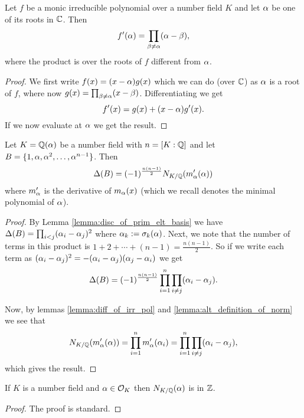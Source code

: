 \begin{lemma}\label{lemma:diff_of_irr_pol}
    \leanok
	Let $f$ be a monic irreducible polynomial over a number field $K$ and let $\alpha$ be one of its roots in $\mathbb{C}$. Then \[f'(\alpha)=\prod_{\beta \neq \alpha} (\alpha-\beta),  \] where the product is over the roots of $f$ different from $\alpha$.
\end{lemma}
\begin{proof}
    \leanok
	We first write $f(x)=(x-\alpha)g(x)$ which we can do (over $\mathbb{C}$) as $\alpha$ is a root of $f$, where now $g(x)=\prod_{\beta \neq \alpha} (x-\beta)$. Differentiating we get \[f'(x)=g(x)+(x-\alpha)g'(x).\] If we now evaluate at $\alpha$ we get the result.
\end{proof}

\begin{lemma}\label{lemma:num_field_disc_in_terms_of_norm}
	\leanok
	Let $K=\mathbb{Q}(\alpha)$ be a number field with $n=[K:\mathbb{Q}]$ and let $B=\{1,\alpha,\alpha^2,\dots,\alpha^{n-1}\}$. Then \[\Delta(B)=(-1)^{\frac{n(n-1)}{2}}N_{K/\mathbb{Q}}(m_\alpha'(\alpha))\] where $m_\alpha'$ is the derivative of $m_\alpha(x)$ (which we recall denotes the minimal polynomial of $\alpha$).
\end{lemma}
\begin{proof}
    \leanok
	By Lemma \ref{lemma:disc_of_prim_elt_basis} we have $\Delta(B)=\prod_{i < j}(\alpha_i-\alpha_j)^2$ where $\alpha_k:=\sigma_k(\alpha)$. Next, we note that the number of terms in this product is $1+2+\cdots+(n-1)=\frac{n(n-1)}{2}$. So if we write each term as $(\alpha_i-\alpha_j)^2=-(\alpha_i-\alpha_j)(\alpha_j-\alpha_i)$ we get \[\Delta(B)=(-1)^{\frac{n(n-1)}{2}}\prod_{i=1}^n \prod_{i \neq j} (\alpha_i-\alpha_j). \]

	Now, by lemmas \ref{lemma:diff_of_irr_pol} and \ref{lemma:alt_definition_of_norm} we see that \[N_{K/\mathbb{Q}}(m_\alpha'(\alpha))=\prod_{i=1}^n m_\alpha'(\alpha_i)=\prod_{i=1}^n \prod_{i \neq j} (\alpha_i-\alpha_j),\] which gives the result.
\end{proof}

\begin{lemma}\label{lemma:norm_of_alg_int_is_int}
	\leanok
	If $K$ is a number field and $\alpha \in \mathcal{O}_K$ then $N_{K/\mathbb{Q}}(\alpha)$ is in $\mathbb{Z}$.
\end{lemma}
\begin{proof}
  \leanok
  The proof is standard.
\end{proof}

